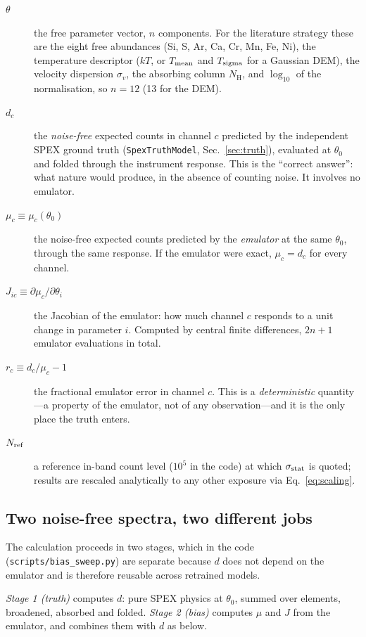\documentclass[11pt,a4paper]{article}
\newcommand{\nh}{N_{\mathrm{H}}}
\newcommand{\code}[1]{\texttt{#1}}
\begin{document}
\begin{description}
\item[$\theta$] the free parameter vector, $n$ components. For the literature
strategy these are the eight free abundances (Si, S, Ar, Ca, Cr, Mn, Fe, Ni),
the temperature descriptor ($kT$, or $T_{\rm mean}$ and $T_{\rm sigma}$ for a
Gaussian DEM), the velocity dispersion $\sigma_v$, the absorbing column $\nh$,
and $\log_{10}$ of the normalisation, so $n=12$ (13 for the DEM).
\item[$d_c$] the \emph{noise-free} expected counts in channel $c$ predicted by
the independent SPEX ground truth (\code{SpexTruthModel}, Sec.~\ref{sec:truth}),
evaluated at $\theta_0$ and folded through the instrument response. This is the
``correct answer'': what nature would produce, in the absence of counting
noise. It involves no emulator.
\item[$\mu_c \equiv \mu_c(\theta_0)$] the noise-free expected counts predicted
by the \emph{emulator} at the same $\theta_0$, through the same response. If the
emulator were exact, $\mu_c=d_c$ for every channel.
\item[$J_{ic} \equiv \partial\mu_c/\partial\theta_i$] the Jacobian of the
emulator: how much channel $c$ responds to a unit change in parameter $i$.
Computed by central finite differences, $2n{+}1$ emulator evaluations in total.
\item[$r_c \equiv d_c/\mu_c - 1$] the fractional emulator error in channel $c$.
This is a \emph{deterministic} quantity---a property of the emulator, not of any
observation---and it is the only place the truth enters.
\item[$N_{\rm ref}$] a reference in-band count level ($10^5$ in the code) at
which $\sigma_{\rm stat}$ is quoted; results are rescaled analytically to any
other exposure via Eq.~\eqref{eq:scaling}.
\end{description}

\subsection{Two noise-free spectra, two different jobs}
The calculation proceeds in two stages, which in the code
(\code{scripts/bias\_sweep.py}) are separate because $d$ does not depend on the
emulator and is therefore reusable across retrained models.

\emph{Stage 1 (truth)} computes $d$: pure SPEX physics at $\theta_0$, summed
over elements, broadened, absorbed and folded. \emph{Stage 2 (bias)} computes
$\mu$ and $J$ from the emulator, and combines them with $d$ as below.
\end{document}
